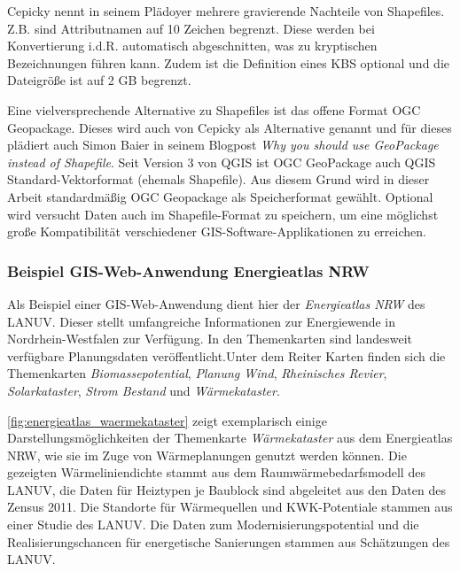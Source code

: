 				
				Cepicky nennt in seinem Plädoyer mehrere gravierende Nachteile von Shapefiles. Z.B. sind Attributnamen auf 10 Zeichen begrenzt. Diese werden bei Konvertierung i.d.R. automatisch abgeschnitten, was zu kryptischen Bezeichnungen führen kann. Zudem ist die Definition eines KBS optional und die Dateigröße ist auf 2 GB begrenzt. \cite{web_shapefiles_must_die_cepicky} 
				
				Eine vielversprechende Alternative zu Shapefiles ist das offene Format OGC Geopackage. Dieses wird auch von Cepicky als Alternative genannt und für dieses plädiert auch Simon Baier in seinem Blogpost \textit{Why you should use GeoPackage instead of Shapefile}. Seit Version 3 von QGIS ist OGC GeoPackage auch QGIS Standard-Vektorformat (ehemals Shapefile). Aus diesem Grund wird in dieser Arbeit standardmäßig OGC Geopackage als Speicherformat gewählt. Optional wird versucht Daten auch im Shapefile-Format zu speichern, um eine möglichst große Kompatibilität verschiedener GIS-Software-Applikationen zu erreichen. \cite{web_geopackage_vs_shapefile_blog_simon}\cite{web_qgis_docs}
				
						
			\subsubsection{Beispiel GIS-Web-Anwendung Energieatlas NRW}
				Als Beispiel einer GIS-Web-Anwendung dient hier der \textit{Energieatlas NRW} des LANUV. Dieser stellt \frqq umfangreiche Informationen zur Energiewende in Nordrhein-Westfalen zur Verfügung. In den Themenkarten sind landesweit verfügbare Planungsdaten veröffentlicht.\flqq Unter dem Reiter Karten finden sich die Themenkarten \textit{Biomassepotential}, \textit{Planung Wind}, \textit{Rheinisches Revier}, \textit{Solarkataster}, \textit{Strom Bestand} und \textit{Wärmekataster}. \cite{web_energieatlas}
				
				\autoref{fig:energieatlas_waermekataster} zeigt exemplarisch einige Darstellungsmöglichkeiten der Themenkarte \textit{Wärmekataster} aus dem Energieatlas NRW, wie sie im Zuge von Wärmeplanungen genutzt werden können. Die gezeigten Wärmeliniendichte stammt aus dem Raumwärmebedarfsmodell des LANUV, die Daten für Heiztypen je Baublock sind abgeleitet aus den Daten des Zensus 2011. Die Standorte für Wärmequellen und KWK-Potentiale stammen aus einer Studie des LANUV. Die Daten zum Modernisierungspotential und die Realisierungschancen für energetische Sanierungen stammen aus Schätzungen des LANUV. \cite{web_energieatlas}
				
